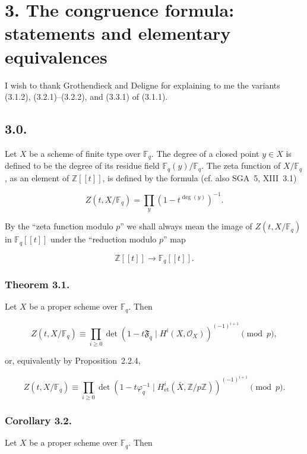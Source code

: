 \section*{3. The congruence formula: statements and elementary equivalences}

I wish to thank Grothendieck and Deligne for explaining to me the variants
(3.1.2), (3.2.1)--(3.2.2), and (3.3.1) of (3.1.1).

\subsection*{3.0.}
Let $X$ be a scheme of finite type over $\mathbb F_q$. The degree of a closed
point $y\in X$ is defined to be the degree of its residue field
$\mathbb F_q(y)/\mathbb F_q$. The zeta function of $X/\mathbb F_q$, as an
element of $\mathbb Z[[t]]$, is defined by the formula (cf. also SGA~5,
XIII~3.1)

\begin{equation}\tag{3.0.1}
Z(t,X/\mathbb F_q)=\prod_y(1-t^{\deg(y)})^{-1}.
\end{equation}

By the ``zeta function modulo $p$'' we shall always mean the image of
$Z(t,X/\mathbb F_q)$ in $\mathbb F_q[[t]]$ under the ``reduction modulo $p$''
map

\[
\mathbb Z[[t]]\longrightarrow\mathbb F_q[[t]].
\]

\subsubsection*{Theorem 3.1.}
Let $X$ be a proper scheme over $\mathbb F_q$. Then

\begin{equation}\tag{3.1.1}
Z(t,X/\mathbb F_q)
\equiv
\prod_{i\geq0}
\det\!\left(1-t\mathfrak F_q\mid H^i(X,\mathcal O_X)\right)^{(-1)^{i+1}}
\pmod p,
\end{equation}

or, equivalently by Proposition~2.2.4,

\begin{equation}\tag{3.1.2}
Z(t,X/\mathbb F_q)
\equiv
\prod_{i\geq0}
\det\!\left(1-t\varphi_q^{-1}\mid
H^i_{\mathrm{et}}(\bar X,\mathbb Z/p\mathbb Z)\right)^{(-1)^{i+1}}
\pmod p.
\end{equation}

\subsubsection*{Corollary 3.2.}
Let $X$ be a proper scheme over $\mathbb F_q$. Then

